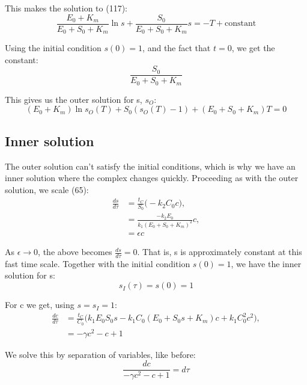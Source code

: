 \documentclass[12pt]{article}
\begin{document}
This makes the solution to (117):
\begin{equation}
\frac{E_0+K_m}{E_0 + S_0 + K_m} \ln{s} + \frac{S_0}{E_0 + S_0 + K_m} s = - T + \text{constant}
\end{equation}

Using the initial condition $s(0)=1$, and the fact that $t=0$, we get
the constant:
\begin{equation}
  \frac{S_0}{E_0 + S_0 + K_m}
\end{equation}

This gives us the outer solution for s, $s_O$:
\begin{equation}
  (E_0+K_m) \ln{s_O(T)} + S_0 (s_O(T) - 1) + (E_0 + S_0 + K_m) T = 0
\end{equation}

\subsection{Inner solution}

The outer solution can't satisfy the initial conditions, which is why
we have an inner solution where the complex changes
quickly. Proceeding as with the outer solution, we scale (65):
\begin{align}
\frac{ds}{d\tau} &= \frac{t_C}{S_0} \Big( - k_2 C_0 c \Big), \\
                 &= \frac{-k_2 E_0}{k_1(E_0 + S_0 + K_m)^2} c, \\
                 &= \epsilon c
\end{align}

As $\epsilon \to 0$, the above becomes $\frac{ds}{d\tau} = 0$. That
is, s is approximately constant at this fast time scale. Together with
the initial condition $s(0)=1$, we have the inner solution for s:
\begin{equation}
s_I(\tau) = s(0) = 1
\end{equation}

For c we get, using $s= s_I = 1$:
\begin{align}
\frac{dc}{d\tau} &= \frac{t_C}{C_0} \Big(
                     k_1 E_0 S_0 s - k_1 C_0 (E_0 + S_0 s + K_m) c + k_1 C_0^2 c^2
                     \Big), \\
                 & = - \gamma c^2 - c + 1
\end{align}

We solve this by separation of variables, like before:
\begin{equation}
\frac{dc}{- \gamma c^2 - c + 1} = d\tau
\end{equation}
\end{document}
